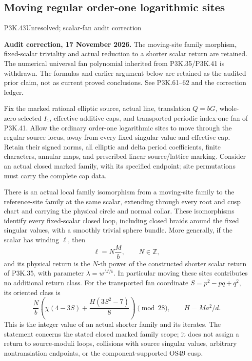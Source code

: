 \subsection{Moving regular order-one logarithmic sites}
\begin{statement}{P3K.43}{Unresolved; scalar-fan audit correction}
\par\noindent\textbf{Audit correction, 17 November 2026.} The moving-site family morphism, fixed-scalar triviality and actual reduction to a shorter scalar return are retained. The numerical universal fan polynomial inherited from P3K.35/P3K.41 is withdrawn. The formulas and earlier argument below are retained as the audited prior claim, not as current proved conclusions. See P3K.61--62 and the correction ledger.
\medskip


Fix the marked rational elliptic source, actual line, translation
\(Q=bG\), whole-zero selected \(I_1\), effective additive caps,
and transported periodic index-one fan of P3K.41. Allow the ordinary
order-one logarithmic sites to move through the regular-source locus,
away from every fixed singular value and effective cap. Retain their
signed norms, all elliptic and delta period coefficients, finite
characters, annular maps, and prescribed linear source/lattice marking.
Consider an actual closed marked family, with its specified endpoint;
site permutations must carry the complete cap data.

There is an actual local family isomorphism from a moving-site family
to the reference-site family at the same scalar, extending through every
root and cusp chart and carrying the physical circle and normal collar.
These isomorphisms identify every fixed-scalar closed loop, including
closed braids around the fixed singular values, with a smoothly trivial
sphere bundle. More generally, if the scalar has winding \(\ell\),
then
\[
                    \ell=N\frac{M}{b},\qquad N\in\mathbb Z,
\]
and its physical return is the \(N\)-th power of the constructed
shorter scalar return of P3K.35, with parameter
\(\lambda=w^{M/b}\). In particular moving these sites contributes
no additional return class. For the transported fan coordinate
\(S=p^2-pq+q^2\), its oriented class is
\[
 \frac{N}{b}\left(\chi(4-3S)+\frac{H(3S^2-7)}8\right)
             \pmod {28},\qquad H=Ma^2/d.
\]
This is the integer value of an actual shorter family and its iterates.
The statement concerns the stated closed marked family scope; it does
not assign a return to source-moduli loops, collisions with source
singular values, arbitrary nontranslation endpoints, or the
component-supported OS49 cusp.

\end{statement}
